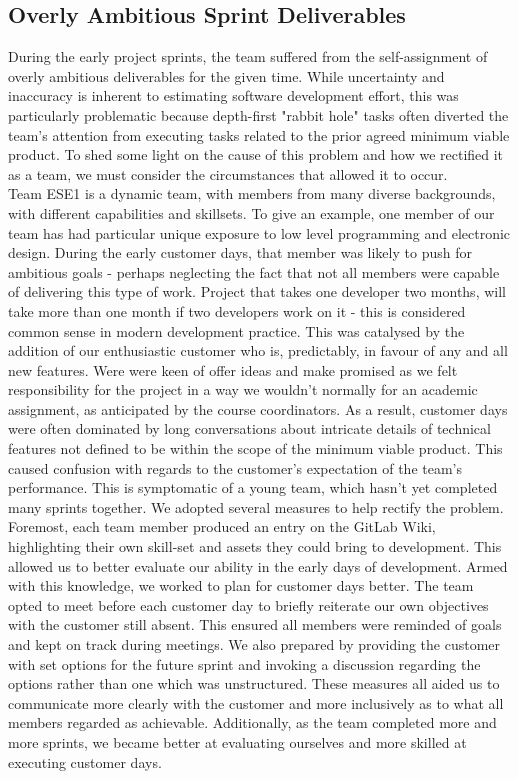 \documentclass{l3proj}
\begin{document}
\subsection{Overly Ambitious Sprint Deliverables}
During the early project sprints, the team suffered from the self-assignment of overly ambitious deliverables for the given time. While uncertainty and inaccuracy is inherent to estimating software development effort\cite{ezghari}, this was particularly problematic because depth-first "rabbit hole" tasks often diverted the team's attention from executing tasks related to the prior agreed minimum viable product. To shed some light on the cause of this problem and how we rectified it as a team, we must consider the circumstances that allowed it to occur.
\\
Team ESE1 is a dynamic team, with members from many diverse backgrounds, with different capabilities and skillsets. To give an example, one member of our team has had particular unique exposure to low level programming and electronic design. During the early customer days, that member was likely to push for ambitious goals - perhaps neglecting the fact that not all members were capable of delivering this type of work. Project that takes one developer two months, will take more than one month if two developers work on it\cite{brooks} - this is considered common sense in modern development practice\cite{hanakawa}. This was catalysed by the addition of our enthusiastic customer who is, predictably, in favour of any and all new features. Were were keen of offer ideas and make promised as we felt responsibility for the project in a way we wouldn't normally for an academic assignment, as anticipated by the course coordinators\cite{simpson}. As a result, customer days were often dominated by long conversations about intricate details of technical features not defined to be within the scope of the minimum viable product. This caused confusion with regards to the customer's expectation of the team's performance. This is symptomatic of a young team, which hasn't yet completed many sprints together. We adopted several measures to help rectify the problem. 
\\ 
Foremost, each team member produced an entry on the GitLab Wiki, highlighting their own skill-set and assets they could bring to development. This allowed us to better evaluate our ability in the early days of development. Armed with this knowledge, we worked to plan for customer days better. The team opted to meet before each customer day to briefly reiterate our own objectives with the customer still absent. This ensured all members were reminded of goals and kept on track during meetings. We also prepared by providing the customer with set options for the future sprint and invoking a discussion regarding the options rather than one which was unstructured. These measures all aided us to communicate more clearly with the customer and more inclusively as to what all members regarded as achievable. Additionally, as the team completed more and more sprints, we became better at evaluating ourselves and more skilled at executing customer days.
\end{document}
